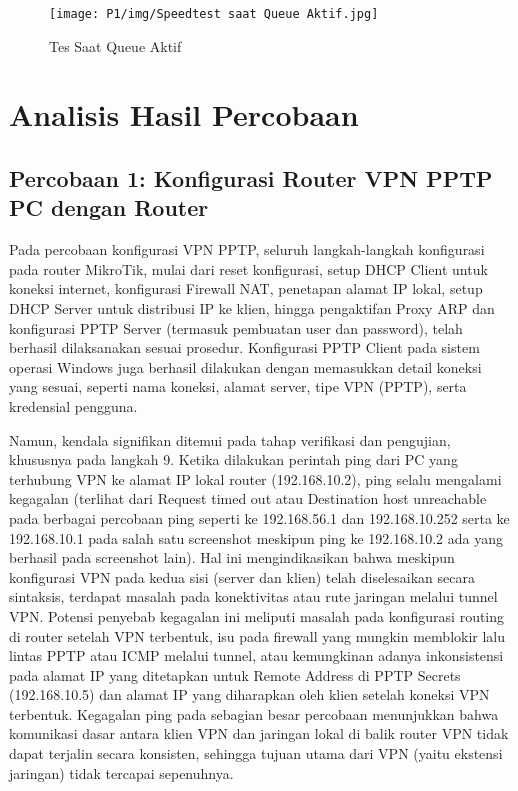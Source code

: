 \begin{figure}[H]
\centering
\begin{minipage}[b]{0.45\textwidth}
\texttt{[image: P1/img/Speedtest saat Queue Aktif.jpg]}
\caption{Tes Saat Queue Aktif}
\label{fig:queue_enabled}
\end{minipage}
\end{figure}


\section{Analisis Hasil Percobaan}

\subsection*{Percobaan 1: Konfigurasi Router VPN PPTP PC dengan Router}

Pada percobaan konfigurasi VPN PPTP, seluruh langkah-langkah konfigurasi pada router MikroTik, mulai dari reset konfigurasi, setup DHCP Client untuk koneksi internet, konfigurasi Firewall NAT, penetapan alamat IP lokal, setup DHCP Server untuk distribusi IP ke klien, hingga pengaktifan Proxy ARP dan konfigurasi PPTP Server (termasuk pembuatan user dan password), telah berhasil dilaksanakan sesuai prosedur. Konfigurasi PPTP Client pada sistem operasi Windows juga berhasil dilakukan dengan memasukkan detail koneksi yang sesuai, seperti nama koneksi, alamat server, tipe VPN (PPTP), serta kredensial pengguna.

Namun, kendala signifikan ditemui pada tahap verifikasi dan pengujian, khususnya pada langkah 9. Ketika dilakukan perintah ping dari PC yang terhubung VPN ke alamat IP lokal router (192.168.10.2), ping selalu mengalami kegagalan (terlihat dari Request timed out atau Destination host unreachable pada berbagai percobaan ping seperti ke 192.168.56.1 dan 192.168.10.252 serta ke 192.168.10.1 pada salah satu screenshot meskipun ping ke 192.168.10.2 ada yang berhasil pada screenshot lain). Hal ini mengindikasikan bahwa meskipun konfigurasi VPN pada kedua sisi (server dan klien) telah diselesaikan secara sintaksis, terdapat masalah pada konektivitas atau rute jaringan melalui tunnel VPN. Potensi penyebab kegagalan ini meliputi masalah pada konfigurasi routing di router setelah VPN terbentuk, isu pada firewall yang mungkin memblokir lalu lintas PPTP atau ICMP melalui tunnel, atau kemungkinan adanya inkonsistensi pada alamat IP yang ditetapkan untuk Remote Address di PPTP Secrets (192.168.10.5) dan alamat IP yang diharapkan oleh klien setelah koneksi VPN terbentuk. Kegagalan ping pada sebagian besar percobaan menunjukkan bahwa komunikasi dasar antara klien VPN dan jaringan lokal di balik router VPN tidak dapat terjalin secara konsisten, sehingga tujuan utama dari VPN (yaitu ekstensi jaringan) tidak tercapai sepenuhnya.

